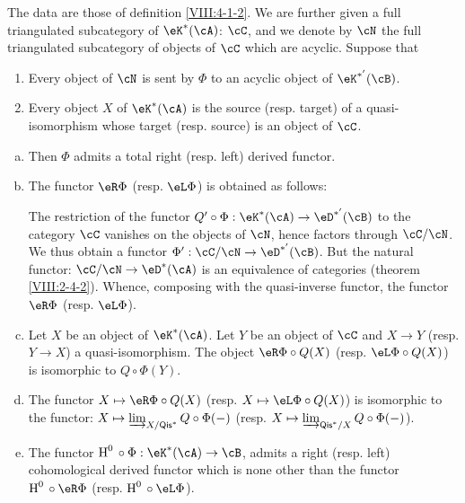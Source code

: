 \begin{theorem}\label{VIII:4-2-3} %
The data are those of definition \ref{VIII:4-1-2}. We are further given a full
triangulated subcategory of $\eK^\ast(\cA)$: $\cC$, and we
denote by $\cN$ the full triangulated subcategory of objects of $\cC$
which are acyclic. Suppose that
\begin{enumerate}[(1)]
  \item Every object of $\cN$ is sent by $\Phi$ to an acyclic object
    of $\eK^{\ast'}(\cB)$.
  \item Every object $X$ of $\eK^\ast(\cA)$ is the source (resp. target) of a
    quasi-isomorphism whose target (resp. source) is an object of $\cC$.
\end{enumerate}
\begin{enumerate}[a)]
  \item Then $\Phi$ admits a total right (resp.
    left) derived functor.
  \item The functor $\eR \Phi$ (resp. $\eL \Phi$) is obtained as
    follows:

    The restriction of the functor
    $Q'\circ \Phi:\eK^\ast(\cA) \to \eD^{\ast'}(\cB)$ to the category $\cC$
    vanishes on the objects of $\cN$, hence factors through $\cC/\cN$. We
    thus obtain a functor $\Phi':\cC/\cN\to \eD^{\ast'}(\cB)$. But the
    natural functor: $\cC/\cN\to \eD^\ast(\cA)$ is an equivalence of
    categories (theorem \ref{VIII:2-4-2}). Whence, composing with the
    quasi-inverse functor, the functor $\eR\Phi$ (resp. $\eL \Phi$).
  \item Let $X$ be an object of $\eK^\ast(\cA)$. Let $Y$ be an object of $\cC$ and
    $X\to Y$ (resp. $Y\to X$) a quasi-isomorphism. The object
    $\eR\Phi\circ Q(X)$ (resp. $\eL \Phi\circ Q(X)$) is isomorphic to
    $Q\circ \Phi(Y)$.
  \item The functor $X\mapsto \eR\Phi\circ Q(X)$ (resp.
    $X\mapsto \eL \Phi\circ Q(X)$) is isomorphic to the functor:
    $X\mapsto \varinjlim_{X/\mathsf{Qis}^\ast} Q\circ\Phi(-)$ (resp.
    $X\mapsto \varinjlim_{\mathsf{Qis}^\ast/X} Q\circ \Phi(-)$).
  \item The functor $\h^0{}\circ \Phi:\eK^\ast(\cA)\to \cB$, admits a
    right (resp. left) cohomological derived functor which is
    none other than the functor $\h^0{}\circ\eR\Phi$ (resp. $\h^0{}\circ \eL\Phi$). 
\end{enumerate}
\end{theorem}





